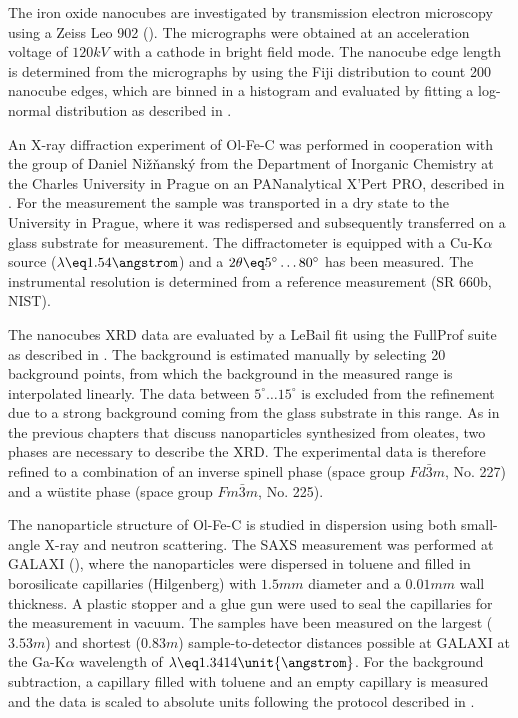 \documentclass[\main/dresen_thesis.tex]{subfiles}
\begin{document}
    The iron oxide nanocubes are investigated by transmission electron microscopy using a Zeiss Leo 902 ().
    The micrographs were obtained at an acceleration voltage of $120 \unit{kV}$ with a  cathode in bright field mode.
    The nanocube edge length is determined from the micrographs by using the Fiji distribution \cite{Schindelin_2012_Fijia} to count 200 nanocube edges, which are binned in a histogram and evaluated by fitting a log-normal distribution as described in .

    An X-ray diffraction experiment of Ol-Fe-C was performed in cooperation with the group of Daniel Nižňanský from the Department of Inorganic Chemistry at the Charles University in Prague on an PANanalytical X'Pert PRO, described in .
    For the measurement the sample was transported in a dry state to the University in Prague, where it was redispersed and subsequently transferred on a glass substrate for measurement.
    The diffractometer is equipped with a Cu-K$\alpha$ source ($\lambda \eq 1.54 \angstrom$) and a $2 \theta \eq 5^\circ \ldots 80^\circ$ has been measured.
    The instrumental resolution is determined from a  reference measurement (SR 660b, NIST).

    The nanocubes XRD data are evaluated by a LeBail fit using the FullProf suite \cite{Rodriguez_1993_Recen} as described in .
    The background is estimated manually by selecting 20 background points, from which the background in the measured range is interpolated linearly.
    The data between $5 ^\circ \ldots 15 ^\circ$ is excluded from the refinement due to a strong background coming from the glass substrate in this range.
    As in the previous chapters that discuss nanoparticles synthesized from oleates, two phases are necessary to describe the XRD.
    The experimental data is therefore refined to a combination of an inverse spinell phase (space group $Fd\bar{3}m$, No. 227) and a w\"ustite phase (space group $Fm\bar{3}m$, No. 225).

    The nanoparticle structure of Ol-Fe-C is studied in dispersion using both small-angle X-ray and neutron scattering.
    The SAXS measurement was performed at GALAXI (), where the nanoparticles were dispersed in toluene and filled in borosilicate capillaries (Hilgenberg) with $1.5 \unit{mm}$ diameter and a $0.01 \unit{mm}$ wall thickness.
    A plastic stopper and a glue gun were used to seal the capillaries for the measurement in vacuum.
    The samples have been measured on the largest ($3.53 \unit{m}$) and shortest ($0.83 \unit{m}$) sample-to-detector distances possible at GALAXI at the Ga-K$\alpha$ wavelength of $\lambda \eq 1.3414 \unit{\angstrom}$.
    For the background subtraction, a capillary filled with toluene and an empty capillary is measured and the data is scaled to absolute units following the protocol described in .
\end{document}
